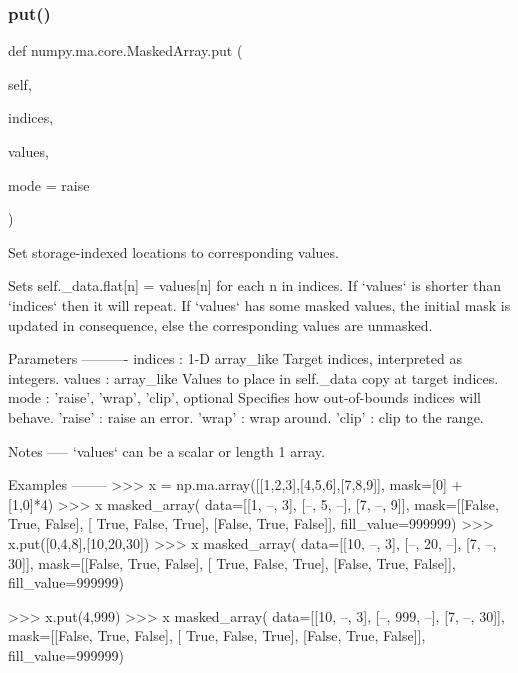 \subsubsection{\texorpdfstring{put()}{put()}}
{\footnotesize\ttfamily def numpy.\+ma.\+core.\+Masked\+Array.\+put (\begin{DoxyParamCaption}\item[{}]{self,  }\item[{}]{indices,  }\item[{}]{values,  }\item[{}]{mode = {\ttfamily \textquotesingle{}raise\textquotesingle{}} }\end{DoxyParamCaption})}

\begin{DoxyVerb}Set storage-indexed locations to corresponding values.

Sets self._data.flat[n] = values[n] for each n in indices.
If `values` is shorter than `indices` then it will repeat.
If `values` has some masked values, the initial mask is updated
in consequence, else the corresponding values are unmasked.

Parameters
----------
indices : 1-D array_like
    Target indices, interpreted as integers.
values : array_like
    Values to place in self._data copy at target indices.
mode : {'raise', 'wrap', 'clip'}, optional
    Specifies how out-of-bounds indices will behave.
    'raise' : raise an error.
    'wrap' : wrap around.
    'clip' : clip to the range.

Notes
-----
`values` can be a scalar or length 1 array.

Examples
--------
>>> x = np.ma.array([[1,2,3],[4,5,6],[7,8,9]], mask=[0] + [1,0]*4)
>>> x
masked_array(
  data=[[1, --, 3],
[--, 5, --],
[7, --, 9]],
  mask=[[False,  True, False],
[ True, False,  True],
[False,  True, False]],
  fill_value=999999)
>>> x.put([0,4,8],[10,20,30])
>>> x
masked_array(
  data=[[10, --, 3],
[--, 20, --],
[7, --, 30]],
  mask=[[False,  True, False],
[ True, False,  True],
[False,  True, False]],
  fill_value=999999)

>>> x.put(4,999)
>>> x
masked_array(
  data=[[10, --, 3],
[--, 999, --],
[7, --, 30]],
  mask=[[False,  True, False],
[ True, False,  True],
[False,  True, False]],
  fill_value=999999)\end{DoxyVerb}
 \mbox{\label{classnumpy_1_1ma_1_1core_1_1MaskedArray_ac230635367ee8b1f153642318663a28c}} 
